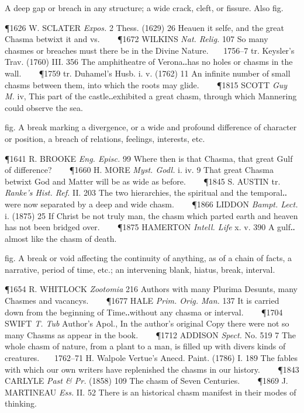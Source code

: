 \begin{description}[wide, labelwidth=!, labelindent=0pt]
\begin{myenumerate}
 A deep gap or breach in any structure; a wide crack, cleft, or fissure. Also fig.

\P 1626 W. SCLATER  \textit{Expos.} 2 Thess. (1629) 26 Heauen it selfe, and the great Chasma betwixt it and vs.    
\P 1672 WILKINS  \textit{Nat. Relig.} 107 So many chasmes or breaches must there be in the Divine Nature.    1756–7 tr. Keysler's Trav. (1760) III. 356 The amphitheatre of Verona‥has no holes or chasms in the wall.    
\P 1759 tr. Duhamel's Husb. i. v. (1762) 11 An infinite number of small chasms between them, into which the roots may glide.    
\P 1815 SCOTT  \textit{Guy M.} iv, This part of the castle‥exhibited a great chasm, through which Mannering could observe the sea.

 fig. A break marking a divergence, or a wide and profound difference of character or position, a breach of relations, feelings, interests, etc.

\P 1641 R. BROOKE  \textit{Eng. Episc.} 99 Where then is that Chasma, that great Gulf of difference?    
\P 1660 H. MORE  \textit{Myst. Godl.} i. iv. 9 That great Chasma betwixt God and Matter will be as wide as before.    
\P 1845 S. AUSTIN tr. \textit{Ranke's Hist. Ref.} II. 203 The two hierarchies, the spiritual and the temporal‥were now separated by a deep and wide chasm.    
\P 1866 LIDDON  \textit{Bampt. Lect.} i. (1875) 25 If Christ be not truly man, the chasm which parted earth and heaven has not been bridged over.    
\P 1875 HAMERTON  \textit{Intell. Life} x. v. 390 A gulf‥almost like the chasm of death.

 fig. A break or void affecting the continuity of anything, as of a chain of facts, a narrative, period of time, etc.; an intervening blank, hiatus, break, interval.

\P 1654 R. WHITLOCK  \textit{Zootomia} 216 Authors with many Plurima Desunts, many Chasmes and vacancys.    
\P 1677 HALE  \textit{Prim. Orig. Man.} 137 It is carried down from the beginning of Time‥without any chasma or interval.    
\P 1704 SWIFT  \textit{T. Tub} Author's Apol., In the author's original Copy there were not so many Chasms as appear in the book.    
\P 1712 ADDISON  \textit{Spect.} No. 519 7 The whole chasm of nature, from a plant to a man, is filled up with divers kinds of creatures.    1762–71 H. Walpole Vertue's Anecd. Paint. (1786) I. 189 The fables with which our own writers have replenished the chasms in our history.    
\P 1843 CARLYLE  \textit{Past \& Pr.} (1858) 109 The chasm of Seven Centuries.    
\P 1869 J. MARTINEAU  \textit{Ess.} II. 52 There is an historical chasm manifest in their modes of thinking.


\end{myenumerate}
\end{description}
